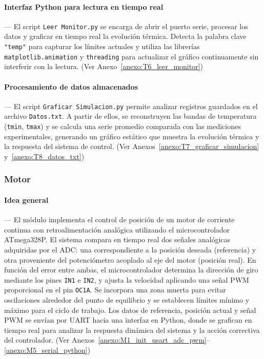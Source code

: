 \vspace{1em}

\paragraph*{\textbf{Interfaz Python para lectura en tiempo real}}---
El script \texttt{Leer Monitor.py} se encarga de abrir el puerto serie, procesar los datos y graficar en tiempo real la evolución térmica. Detecta la palabra clave \texttt{"temp"} para capturar los límites actuales y utiliza las librerías \texttt{matplotlib.animation} y \texttt{threading} para actualizar el gráfico continuamente sin interferir con la lectura. (Ver Anexo~\ref{anexo:T6_leer_monitor})

\vspace{1em}

\paragraph*{\textbf{Procesamiento de datos almacenados}}---
El script \texttt{Graficar Simulacion.py} permite analizar registros guardados en el archivo \texttt{Datos.txt}. A partir de ellos, se reconstruyen las bandas de temperatura (\texttt{tmin}, \texttt{tmax}) y se calcula una serie promedio comparada con las mediciones experimentales, generando un gráfico estático que muestra la evolución térmica y la respuesta del sistema de control. (Ver Anexos~\ref{anexo:T7_graficar_simulacion} y~\ref{anexo:T8_datos_txt})



\vspace{1em}

\subsubsection{\textbf{Motor}}

\paragraph*{\textbf{Idea general}}---
El módulo implementa el control de posición de un motor de corriente continua con retroalimentación analógica utilizando el microcontrolador ATmega328P. El sistema compara en tiempo real dos señales analógicas adquiridas por el ADC: una correspondiente a la posición deseada (referencia) y otra proveniente del potenciómetro acoplado al eje del motor (posición real). En función del error entre ambas, el microcontrolador determina la dirección de giro mediante los pines \texttt{IN1} e \texttt{IN2}, y ajusta la velocidad aplicando una señal PWM proporcional en el pin \texttt{OC1A}. Se incorpora una zona muerta para evitar oscilaciones alrededor del punto de equilibrio y se establecen límites mínimo y máximo para el ciclo de trabajo. Los datos de referencia, posición actual y señal PWM se envían por UART hacia una interfaz en Python, donde se grafican en tiempo real para analizar la respuesta dinámica del sistema y la acción correctiva del controlador. (Ver Anexos~\ref{anexo:M1_init_usart_adc_pwm}–\ref{anexo:M5_serial_python})


